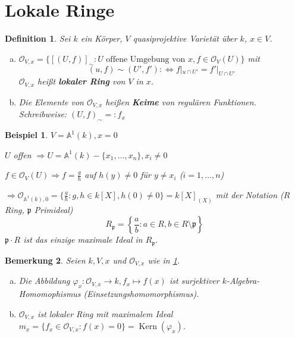 \documentclass[a4paper, 12pt, numbers=noendperiod, chapterprefix=true]{scrbook}
\theoremstyle{break}
\newtheorem{Def}{Definition}[section]
\newtheorem{Bem}[Def]{Bemerkung}
\theoremstyle{nonumberbreak}
\newtheorem{nnBsp}{Beispiel}
\theoremstyle{nonumberplain}
\newcommand{\quot}[1]{\textrm{\glqq}{#1}\textrm{\grqq}}
\newcommand{\emp}[1]{\textbf{\emph{#1}}}
\newcommand{\defterm}[1]{{\index{#1}}\emp{#1}}
\newcommand{\deftermspec}[2]{{\index{#2}}\emp{#1}}
\DeclareMathOperator{\Kern}{Kern}
\newcommand{\A}{\mathbb{A}}
\newcommand{\calO}{\mathcal{O}}
\begin{document}
\section{Lokale Ringe}

\begin{Def}\label{def15.1}
Sei $k$ ein K\"orper, $V$ quasiprojektive Variet\"at \"uber $k$, $x\in V$.
\begin{enumerate}[a)]
\item
	$\calO_{V,x}=\{[(U,f)]_{\sim}: U \text{ offene Umgebung von } x, f\in \calO_V(U)\}$ mit \[(u,f)\sim (U',f') :\Leftrightarrow f|_{u\cap U'}=f'|_{U\cap U'}\]
	$\calO_{V,x}$ hei\ss t \defterm{lokaler Ring} von $V$ in $x$.
\item
	Die Elemente von $\calO_{V,x}$ hei\ss en \deftermspec{Keime}{Keim} von regul\"aren Funktionen. \emph{Schreibweise}: $(U,f)_\sim=:f_x$
\end{enumerate}\end{Def}

\begin{nnBsp}
$V=\A^1(k), x=0$

$U$ offen $\Rightarrow U=\A^1(k)-\{x_1,\ldots ,x_n\}, x_i\ne 0$

$f\in \calO_V(U)\Rightarrow f=\frac{g}{h}$ auf $h(y)\ne 0$ f\"ur $y\ne x_i$ ($i=1,\ldots ,n$)

$\Rightarrow \calO_{\A^1(k),0} = \{\frac{g}{h}:g,h\in k[X], h(0)\ne 0\} = k[X]_{(X)}$ mit der Notation ($R$ Ring, $\mathfrak p$ Primideal)
	\[ R_{\mathfrak p} = \left\{ \frac{a}{b} : a\in R, b\in R\setminus \mathfrak p\right\} \]
$\mathfrak p\cdot R$ ist das einzige maximale Ideal in $R_{\mathfrak p}$.
\end{nnBsp}

\begin{Bem}
Seien $k,V,x$ und $\calO_{V,x}$ wie in \ref{def15.1}.
\begin{enumerate}[a)]
\item
	Die Abbildung $\varphi_x:\calO_{V,x}\to k, f_x\mapsto f(x)$ ist surjektiver $k$-Algebra-Homomophismus (\quot{Einsetzungshomomorphismus}).
\item
	$\calO_{V,x}$ ist lokaler Ring mit maximalem Ideal $m_x=\{f_x\in \calO_{V,x}:f(x)=0\}=\Kern(\varphi_x)$.
\end{enumerate}\end{Bem}
\end{document}
